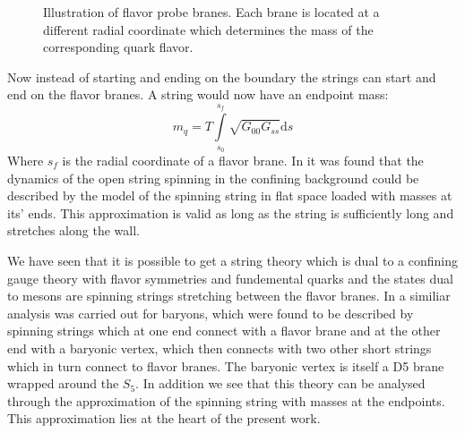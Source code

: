 \documentclass[11pt,a4paper]{article}
\begin{document}
\begin{figure}
\centering
{}
\caption{Illustration of flavor probe branes. Each brane is located at a different radial coordinate which determines the mass of the corresponding quark flavor.}
\end{figure}

Now instead of starting and ending on the boundary the strings can start and end on the flavor branes. A string would now have an endpoint mass:
\begin{equation}
m_q=	T\int\limits_{s_0}^{s_f} \sqrt{G_{00}G_{ss}}\mathrm{d}s
\end{equation}
Where $s_f$ is the radial coordinate of a flavor brane. In \cite{Kruczenski05} it was found that the dynamics of the open string spinning in the confining background could be described by the model of the spinning string in flat space loaded with masses at its' ends. This approximation is valid as long as the string is sufficiently long and stretches along the wall.

We have seen that it is possible to get a string theory which is dual to a confining gauge theory with flavor symmetries and fundemental quarks and the states dual to mesons are spinning strings stretching between the flavor branes. In \cite{Seki08} a similiar analysis was carried out for baryons, which were found to be described by spinning strings which at one end connect with a flavor brane and at the other end with a baryonic vertex, which then connects with two other short strings which in turn connect to flavor branes. The baryonic vertex is itself a D5 brane wrapped around the $S_5$. In addition we see that this theory can be analysed through the approximation of the spinning string with masses at the endpoints. This approximation lies at the heart of the present work.
\end{document}
